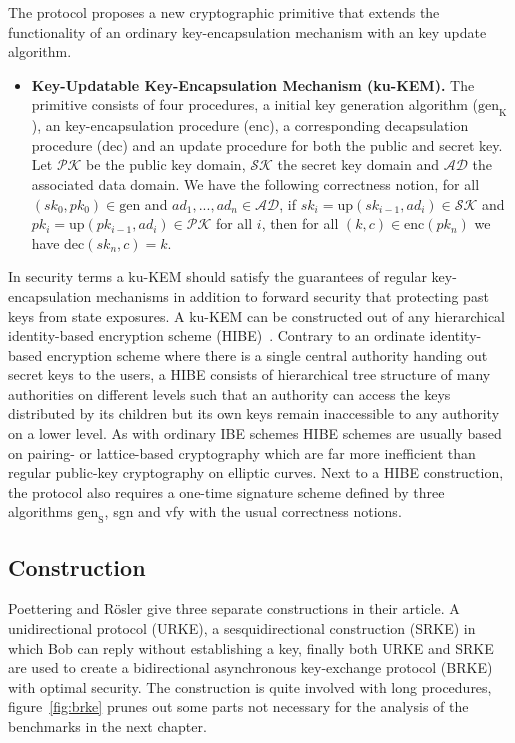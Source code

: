 \documentclass[11pt,a4paper,twoside,openright,bibliography=totoc]{scrbook}
\renewcommand{\t}{\text} %
\begin{document}
The protocol proposes a new cryptographic primitive that extends the
functionality of an ordinary key-encapsulation mechanism with an
key update algorithm.
\begin{itemize}
\item \textbf{Key-Updatable Key-Encapsulation Mechanism (ku-KEM).} The primitive
  consists of four procedures, a initial key generation algorithm ($\t{gen}_\t{K}$), an
  key-encapsulation procedure (enc), a corresponding decapsulation procedure (dec) and
  an update procedure for both the public and secret key. Let $\mathcal{PK}$ be
  the public key domain, $\mathcal{SK}$ the secret key domain and $\mathcal{AD}$ the
  associated data domain. We have the following correctness notion, for all
  $(sk_0, pk_0) \in \t{gen}$ and $ad_1,...,ad_n \in \mathcal{AD}$, if
  $sk_i = \t{up}(sk_{i-1},ad_i) \in \mathcal{SK}$ and
  $pk_i = \t{up}(pk_{i-1},ad_i) \in \mathcal{PK}$ for all $i$, then for all
  $(k,c) \in \t{enc}(pk_n)$ we have $\t{dec}(sk_n,c)=k$.
\end{itemize}
In security terms a ku-KEM should satisfy the guarantees of regular
key-encapsulation mechanisms in addition to forward security that
protecting past keys from state exposures. A ku-KEM can be constructed
out of any hierarchical identity-based encryption scheme
(HIBE)~\cite{gentry2002hierarchical}. Contrary to an ordinate
identity-based encryption scheme where there is a single central
authority handing out secret keys to the users, a HIBE consists
of hierarchical tree structure of many authorities on different levels
such that an authority can access the keys distributed by its children
but its own keys remain inaccessible to any authority on a lower level.
As with ordinary IBE schemes HIBE schemes are usually based on pairing- or
lattice-based cryptography which are far more inefficient than
regular public-key cryptography on elliptic curves.
Next to a HIBE construction, the protocol also requires a one-time signature scheme
defined by three algorithms $\t{gen}_\t{S}$, sgn and vfy with the
usual correctness notions.

\subsection{Construction}
\label{sec:construction}

Poettering and Rösler give three separate constructions in their article.
A unidirectional protocol (URKE), a sesquidirectional construction (SRKE) in which
Bob can reply without establishing a key, finally both URKE and SRKE
are used to create a bidirectional asynchronous key-exchange protocol (BRKE)
with optimal security. The construction is quite involved with long
procedures, figure~\ref{fig:brke} prunes out some parts not necessary for the
analysis of the benchmarks in the next chapter.
\end{document}
